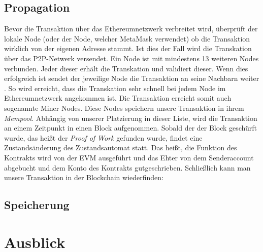 \documentclass[runningheads]{llncs}
\begin{document}
\subsection{Propagation}
Bevor die Transaktion über das Ethereumnetzwerk verbreitet wird, überprüft der lokale Node (oder der Node, welcher MetaMask verwendet) ob die Transaktion wirklich von der eigenen Adresse stammt. Ist dies der Fall wird die Transkation über das P2P-Netwerk versendet. Ein Node ist mit mindestens 13 weiteren Nodes verbunden\cite[S.123]{antonopoulos_mastering_2019}. Jeder dieser erhält die Transkation und validiert dieser. Wenn dies erfolgreich ist sendet der jeweilige Node die Transaktion an seine Nachbarn weiter \cite[S.123]{antonopoulos_mastering_2019}. So wird erreicht, dass die Transkation sehr schnell bei jedem Node im Ethereumnetzwerk angekommen ist. Die Transaktion erreicht somit auch sogenannte Miner Nodes. Diese Nodes speichern unsere Transaktion in ihrem \textit{Mempool}. Abhängig von unserer Platzierung in dieser Liste, wird die Transaktion an einem Zeitpunkt in einen Block aufgenommen. Sobald der der Block geschürft wurde, das heißt der \textit{Proof of Work} gefunden wurde, findet eine Zustandsänderung des Zustandsautomat statt. Das heißt, die Funktion des Kontrakts wird von der EVM ausgeführt und das Ehter von dem Senderaccount abgebucht und dem Konto des Kontrakts gutgeschrieben. Schließlich kann man unsere Transaktion in der Blockchain wiederfinden: %
\subsection{Speicherung}

\section{Ausblick}



\end{document}
